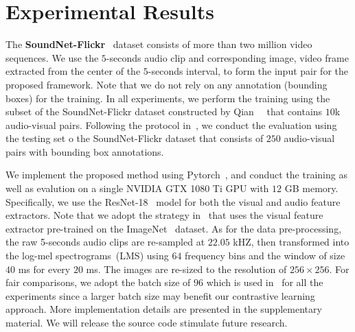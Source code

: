 
% 

\section{Experimental Results}
\label{sec:results}

 The \textbf{SoundNet-Flickr}~\cite{av_nips16_soundnet} dataset consists of more than two million video sequences.
% 
We use the $5$-seconds audio clip and corresponding image, \ie video frame extracted from the center of the $5$-seconds interval, to form the input pair for the proposed framework.
% 
Note that we do not rely on any annotation (\eg bounding boxes) for the training.
%
In all experiments, we perform the training using the subset of the SoundNet-Flickr dataset constructed by Qian~\etal~\cite{av_eccv20_mms_loc} that contains $10$k audio-visual pairs.
%
Following the protocol in~\cite{av_eccv20_mms_loc,av_cvpr18_lls,av_tpami20_lls}, we conduct the evaluation using the testing set o the SoundNet-Flickr dataset that consists of $250$ audio-visual pairs with bounding box annotations.
%
% 
% 
% 


 We implement the proposed method using Pytorch~\cite{pytorch}, and conduct the training as well as evalution on a single NVIDIA GTX 1080 Ti GPU with $12$ GB memory.
%
Specifically, we use the ResNet-18~\cite{resnet} model for both the visual and audio feature extractors.
%
Note that we adopt the strategy in~\cite{av_eccv20_mms_loc} that uses the visual feature extractor pre-trained on the ImageNet~\cite{ImageNet} dataset.
%
As for the data pre-processing, the raw 5-seconds audio clips are re-sampled at $22.05$ kHZ, then transformed into the log-mel spectrograms~(LMS) using $64$ frequency bins and the window of size $40$ ms for every $20$ ms.
%
The images are re-sized to the resolution of $256\times 256$.
%
For fair comparisons, we adopt the batch size of $96$ which is used in~\cite{av_eccv20_mms_loc} for all the experiments since a larger batch size may benefit our contrastive learning approach.
%
More implementation details are presented in the supplementary material.
%
We will release the source code stimulate future research.

